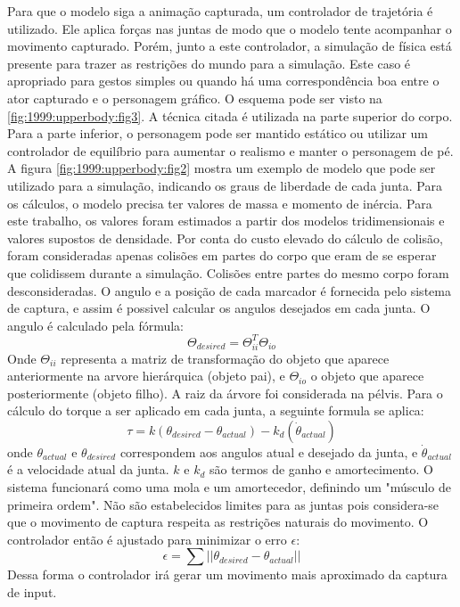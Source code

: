 Para que o modelo siga a animação capturada, um controlador de trajetória é utilizado. Ele aplica forças nas juntas de modo que o modelo tente acompanhar o movimento capturado. Porém, junto a este controlador, a simulação de física está presente para trazer as restrições do mundo para a simulação. Este caso é apropriado para gestos simples ou quando há uma correspondência boa entre o ator capturado e o personagem gráfico. O esquema pode ser visto na \ref{fig:1999:upperbody:fig3}.
A técnica citada é utilizada na parte superior do corpo. Para a parte inferior, o personagem pode ser mantido estático ou utilizar um controlador de equilíbrio para aumentar o realismo e manter o personagem de pé. A figura \ref{fig:1999:upperbody:fig2} mostra um exemplo de modelo que pode ser utilizado para a simulação, indicando os graus de liberdade de cada junta.
Para os cálculos, o modelo precisa ter valores de massa e momento de inércia. Para este trabalho, os valores foram estimados a partir dos modelos tridimensionais e valores supostos de densidade.
Por conta do custo elevado do cálculo de colisão, foram consideradas apenas colisões em partes do corpo que eram de se esperar que colidissem durante a simulação. Colisões entre partes do mesmo corpo foram desconsideradas.
O angulo e a posição de cada marcador é fornecida pelo sistema de captura, e assim é possivel calcular os angulos desejados em cada junta. O angulo é calculado pela fórmula:
\begin{equation}
  \label{eq:1999:upperbody:calc_angulo}
  \Theta_{desired} = \Theta_{ii}^T\Theta_{io}
\end{equation}
Onde $ \Theta_{ii} $ representa a matriz de transformação do objeto que aparece anteriormente na arvore hierárquica (objeto pai), e $ \Theta_{io} $ o objeto que aparece posteriormente (objeto filho). A raiz da árvore foi considerada na pélvis.
Para o cálculo do torque a ser aplicado em cada junta, a seguinte formula se aplica:
\begin{equation}
  \label{eq:1999:upperbody:calc_torque}
  \tau = k ( \theta_{desired} - \theta_{actual} ) - k_d ( \dot{\theta}_{actual} )
\end{equation}
onde $\theta_{actual}$ e $\theta_{desired}$ correspondem aos angulos atual e desejado da junta, e $\dot{\theta}_{actual}$ é a velocidade atual da junta. $k$ e $k_d$ são termos de ganho e amortecimento. O sistema funcionará como uma mola e um amortecedor, definindo um "músculo de primeira ordem".
Não são estabelecidos limites para as juntas pois considera-se que o movimento de captura respeita as restrições naturais do movimento.
O controlador então é ajustado para minimizar o erro $\epsilon$:
\begin{equation}
  \label{eq:1999:upperbody:calc_stiffness}
  \epsilon = \sum{||\theta_{desired}-\theta_{actual}||}
\end{equation}
Dessa forma o controlador irá gerar um movimento mais aproximado da captura de input.

